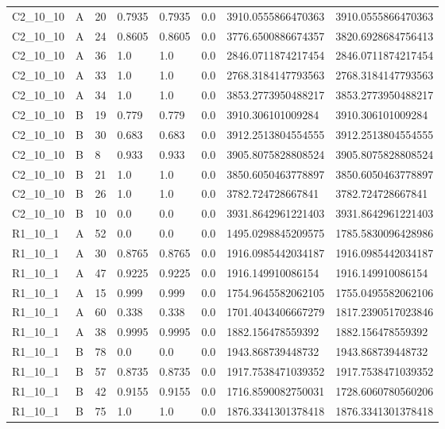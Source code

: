 \begin{tabular}{llllllll}
 C2\_10\_10 & A & 20 & 0.7935 & 0.7935 & 0.0 & 3910.0555866470363 & 3910.0555866470363 \\
 C2\_10\_10 & A & 24 & 0.8605 & 0.8605 & 0.0 & 3776.6500886674357 & 3820.6928684756413 \\
 C2\_10\_10 & A & 36 & 1.0 & 1.0 & 0.0 & 2846.0711874217454 & 2846.0711874217454 \\
 C2\_10\_10 & A & 33 & 1.0 & 1.0 & 0.0 & 2768.3184147793563 & 2768.3184147793563 \\
 C2\_10\_10 & A & 34 & 1.0 & 1.0 & 0.0 & 3853.2773950488217 & 3853.2773950488217 \\
 C2\_10\_10 & B & 19 & 0.779 & 0.779 & 0.0 & 3910.306101009284 & 3910.306101009284 \\
 C2\_10\_10 & B & 30 & 0.683 & 0.683 & 0.0 & 3912.2513804554555 & 3912.2513804554555 \\
 C2\_10\_10 & B & 8 & 0.933 & 0.933 & 0.0 & 3905.8075828808524 & 3905.8075828808524 \\
 C2\_10\_10 & B & 21 & 1.0 & 1.0 & 0.0 & 3850.6050463778897 & 3850.6050463778897 \\
 C2\_10\_10 & B & 26 & 1.0 & 1.0 & 0.0 & 3782.724728667841 & 3782.724728667841 \\
 C2\_10\_10 & B & 10 & 0.0 & 0.0 & 0.0 & 3931.8642961221403 & 3931.8642961221403 \\
 R1\_10\_1 & A & 52 & 0.0 & 0.0 & 0.0 & 1495.0298845209575 & 1785.5830096428986 \\
 R1\_10\_1 & A & 30 & 0.8765 & 0.8765 & 0.0 & 1916.0985442034187 & 1916.0985442034187 \\
 R1\_10\_1 & A & 47 & 0.9225 & 0.9225 & 0.0 & 1916.149910086154 & 1916.149910086154 \\
 R1\_10\_1 & A & 15 & 0.999 & 0.999 & 0.0 & 1754.9645582062105 & 1755.0495582062106 \\
 R1\_10\_1 & A & 60 & 0.338 & 0.338 & 0.0 & 1701.4043406667279 & 1817.2390517023846 \\
 R1\_10\_1 & A & 38 & 0.9995 & 0.9995 & 0.0 & 1882.156478559392 & 1882.156478559392 \\
 R1\_10\_1 & B & 78 & 0.0 & 0.0 & 0.0 & 1943.868739448732 & 1943.868739448732 \\
 R1\_10\_1 & B & 57 & 0.8735 & 0.8735 & 0.0 & 1917.7538471039352 & 1917.7538471039352 \\
 R1\_10\_1 & B & 42 & 0.9155 & 0.9155 & 0.0 & 1716.8590082750031 & 1728.6060780560206 \\
 R1\_10\_1 & B & 75 & 1.0 & 1.0 & 0.0 & 1876.3341301378418 & 1876.3341301378418 \\

\end{tabular}
